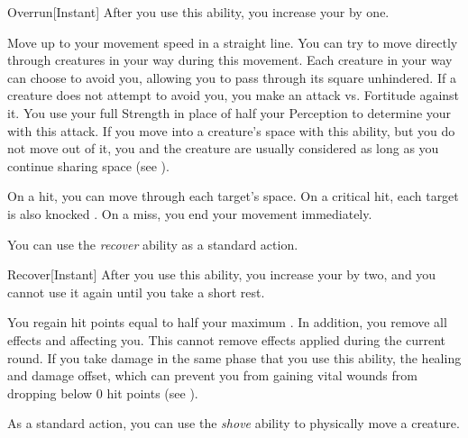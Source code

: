         \begin{instantability}{Overrun}[Instant]
            \rankline
            After you use this ability, you increase your  by one.

            Move up to your movement speed in a straight line.
            You can try to move directly through creatures in your way during this movement.
            Each creature in your way can choose to avoid you, allowing you to pass through its square unhindered.
            If a creature does not attempt to avoid you, you make an attack vs. Fortitude against it.
            You use your full Strength in place of half your Perception to determine your  with this attack.
            If you move into a creature's space with this ability, but you do not move out of it, you and the creature are usually considered \squeezing as long as you continue sharing space (see ).

            On a hit, you can move through each target's space.
            On a critical hit, each target is also knocked \prone.
            On a miss, you end your movement immediately.
        \end{instantability}

        \label{Recover} You can use the \textit{recover} ability as a standard action.
        \begin{instantability}{Recover}[Instant]
            \rankline
            After you use this ability, you increase your  by two, and you cannot use it again until you take a short rest.

            You regain hit points equal to half your maximum .
            In addition, you remove all  effects and  affecting you.
            This cannot remove effects applied during the current round.
            If you take damage in the same phase that you use this ability, the healing and damage offset, which can prevent you from gaining vital wounds from dropping below 0 hit points (see ).
        \end{instantability}

        \label{Shove} As a standard action, you can use the \textit{shove} ability to physically move a creature.

